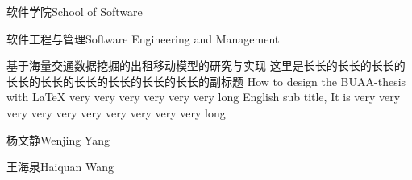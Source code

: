
\school
{软件学院}{School of Software}

\major
{软件工程与管理}{Software Engineering and Management}

\thesistitle
{基于海量交通数据挖掘的出租移动模型的研究与实现}
{这里是长长的长长的长长的长长的长长的长长的长长的长长的长长的副标题}
{How to design the BUAA-thesis with \LaTeX{} very very very very very very long}
{English sub title, It is very very very very very very very very very very long}

\thesisauthor
{杨文静}{Wenjing Yang}

\teacher
{王海泉}{Haiquan Wang}






